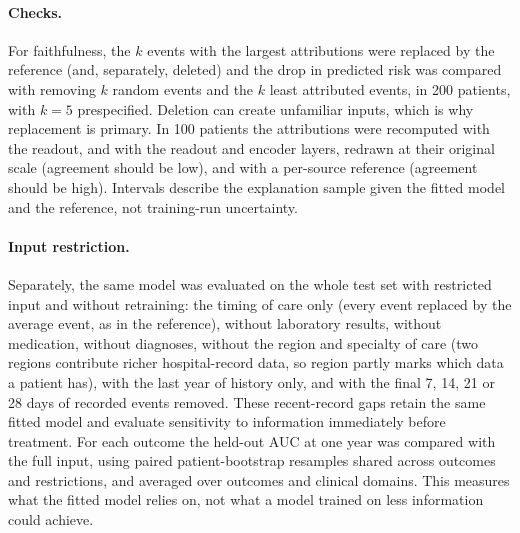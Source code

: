 \paragraph{Checks.} For faithfulness, the $k$ events with the largest
attributions were replaced by the reference (and, separately, deleted) and the
drop in predicted risk was compared with removing $k$ random events and the $k$
least attributed events, in 200 patients, with $k=5$ prespecified. Deletion can
create unfamiliar inputs, which is why replacement is primary. In 100 patients
the attributions were recomputed with the readout, and with the readout and
encoder layers, redrawn at their original scale \citep{adebayo2018sanity}
(agreement should be low), and with a per-source reference (agreement should be
high). Intervals describe the explanation sample given the fitted model and the
reference, not training-run uncertainty.

\paragraph{Input restriction.} Separately, the same model was evaluated on the
whole test set with restricted input and without retraining: the timing of care
only (every event replaced by the average event, as in the reference), without
laboratory results, without medication, without diagnoses, without the region
and specialty of care (two regions contribute richer hospital-record data, so
region partly marks which data a patient has), with the last year of history only, and with the final 7, 14, 21 or 28 days
of recorded events removed. These recent-record gaps retain the same fitted
model and evaluate sensitivity to information immediately before treatment.
For each outcome the held-out AUC at one year was compared with the full input,
using paired patient-bootstrap resamples shared across outcomes and
restrictions, and averaged over outcomes and clinical domains. This measures
what the fitted model relies on, not what a model trained on less information
could achieve.

